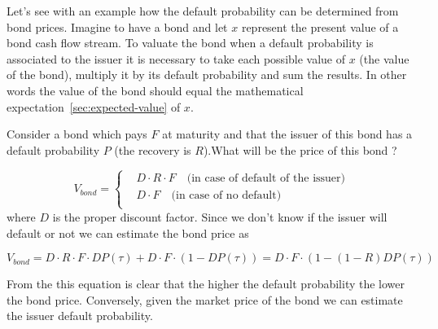 Let's see with an example how the default probability can be determined
from bond prices. Imagine to have a bond and let \(x\) represent the
present value of a bond cash flow stream.
To valuate the bond when a default probability is associated to 
the issuer it is necessary to take each possible value of $x$ (the value of the bond), multiply it by its default probability and sum the results. 
In other words the value of the
bond should equal the mathematical expectation~\ref{sec:expected-value} of $x$.

Consider a bond which pays $F$ at maturity and that the issuer of this
bond has a default probability $P$ (the recovery is
$R$).What will be the price of this bond ?

\begin{equation}
V_{bond} =
\begin{cases}
& D \cdot R \cdot F\quad\textrm{(in case of default of the issuer)}\\
&D \cdot F\quad\textrm{(in case of no default)}\\
\end{cases}\end{equation} 
where \(D\) is the proper discount factor. Since we don't
know if the issuer will default or not we can estimate the bond price as

\begin{equation}
V_{bond} = D \cdot R \cdot F \cdot DP ( \tau ) + D \cdot F \cdot ( 1 − DP ( \tau)) = D\cdot F \cdot ( 1 − ( 1 − R ) DP ( \tau ))
\end{equation}

From the this equation is clear that the higher the default probability
the lower the bond price. Conversely, given the market price of the
bond we can estimate the issuer default probability.

%


